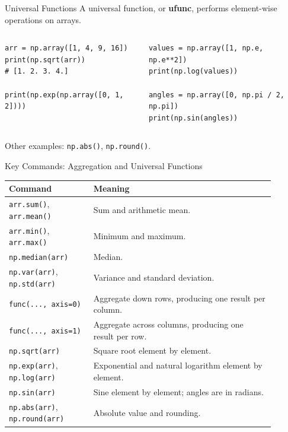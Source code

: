 \documentclass[aspectratio=169,11pt]{beamer}
\newcommand{\key}[1]{\textbf{\textcolor{AccentGreen}{#1}}}
\begin{document}
\begin{frame}[fragile]{Universal Functions}
\small
A universal function, or \key{ufunc}, performs element-wise operations on arrays.
\begin{columns}[T]
\begin{lstlisting}[style=py]
arr = np.array([1, 4, 9, 16])
print(np.sqrt(arr))
# [1. 2. 3. 4.]

print(np.exp(np.array([0, 1, 2])))
\end{lstlisting}
\begin{lstlisting}[style=py]
values = np.array([1, np.e, np.e**2])
print(np.log(values))

angles = np.array([0, np.pi / 2, np.pi])
print(np.sin(angles))
\end{lstlisting}
\end{columns}
\vspace{0.4em}
Other examples: \texttt{np.abs()}, \texttt{np.round()}.
\end{frame}

\begin{frame}{Key Commands: Aggregation and Universal Functions}
\scriptsize
\begin{tabular}{p{0.29\linewidth}p{0.60\linewidth}}
\toprule
\textbf{Command} & \textbf{Meaning} \\
\midrule
\texttt{arr.sum()}, \texttt{arr.mean()} & Sum and arithmetic mean. \\
\texttt{arr.min()}, \texttt{arr.max()} & Minimum and maximum. \\
\texttt{np.median(arr)} & Median. \\
\texttt{np.var(arr)}, \texttt{np.std(arr)} & Variance and standard deviation. \\
\texttt{func(..., axis=0)} & Aggregate down rows, producing one result per column. \\
\texttt{func(..., axis=1)} & Aggregate across columns, producing one result per row. \\
\texttt{np.sqrt(arr)} & Square root element by element. \\
\texttt{np.exp(arr)}, \texttt{np.log(arr)} & Exponential and natural logarithm element by element. \\
\texttt{np.sin(arr)} & Sine element by element; angles are in radians. \\
\texttt{np.abs(arr)}, \texttt{np.round(arr)} & Absolute value and rounding. \\
\bottomrule
\end{tabular}
\end{frame}
\end{document}
